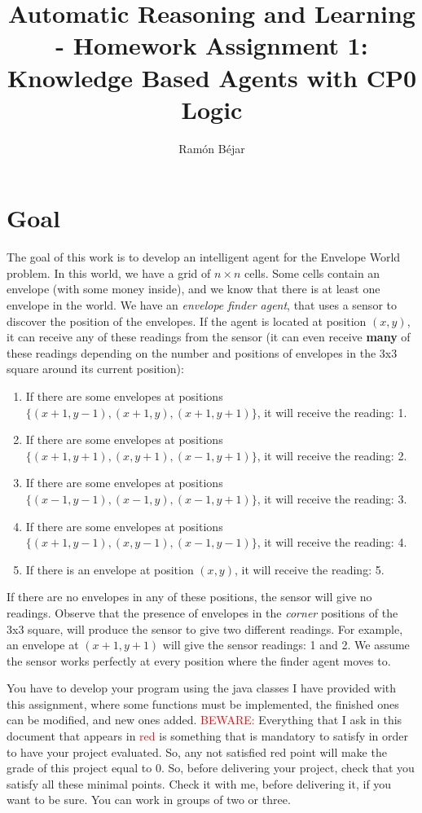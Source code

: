 \documentclass{tufte-handout}
\title[HW 1: Knowledge Based Agents]{Automatic Reasoning and Learning \\-
Homework Assignment 1: Knowledge Based Agents with  CP0 Logic}
\author[ramon]{Ram\'on B\'ejar}
\begin{document}
\maketitle

\section{Goal}

\begin{fullwidth}
The goal of this work is to develop an intelligent agent for
the Envelope World problem. In this world, we have a grid of
$n \times n$ cells. Some cells contain an envelope (with some money inside),
 and we know that  there is at least one envelope in the world.
We have an {\it envelope finder agent}, that uses a sensor to discover the position
of the envelopes.  If the agent is located at position $(x,y)$, it can receive
any of these readings from the sensor (it can even receive {\bf many} of these readings
depending on the number and positions of envelopes in the 3x3 square around its
 current position):
\begin{enumerate}
\item If there are some envelopes at positions $\{(x+1,y-1),(x+1,y),(x+1,y+1) \} $,
it will receive the reading: 1.
\item  If there are some envelopes at positions $\{(x+1,y+1),(x,y+1),(x-1,y+1) \} $,
it will receive the reading: 2.
\item  If there are some envelopes at positions $\{(x-1,y-1),(x-1,y),(x-1,y+1) \} $,
it will receive the reading: 3.
\item  If there are some envelopes at positions $\{(x+1,y-1),(x,y-1),(x-1,y-1) \} $,
it will receive the reading: 4.
\item  If there is an envelope at position $(x,y)$, it will receive the reading: 5.
\end{enumerate}
If there are no envelopes in any of these positions, the sensor will give no readings.
Observe that the presence of envelopes in the {\it corner} positions of the 3x3 square,
will produce the sensor to give two different readings. For example, an envelope
at $(x+1,y+1)$ will give the sensor readings: 1 and 2.
We assume the sensor works perfectly at every position where the finder agent moves to.

You have to develop your program using the java classes I have provided
with this assignment, where some functions must be implemented, the
finished ones can be modified, and new ones added.
\textcolor{red}{BEWARE:} Everything that I ask in this document that appears in
\textcolor{red}{red} is something that is mandatory to satisfy in order to have
your project evaluated. So, any not satisfied  red point will make the grade of this
project equal to 0. So, before delivering your project, check that you satisfy all these
minimal points. Check it with me, before delivering it, if you want to be sure.
You can work in groups of two or three.


\end{fullwidth}
\end{document}
